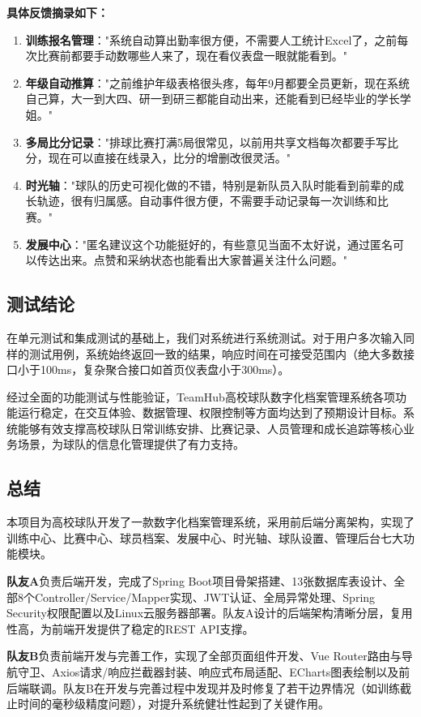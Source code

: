 \documentclass[12pt,a4paper]{ctexart}
\begin{document}
\textbf{具体反馈摘录如下：}
\begin{enumerate}[label=(\arabic*)]
\item \textbf{训练报名管理}："系统自动算出勤率很方便，不需要人工统计Excel了，之前每次比赛前都要手动数哪些人来了，现在看仪表盘一眼就能看到。"
\item \textbf{年级自动推算}："之前维护年级表格很头疼，每年9月都要全员更新，现在系统自己算，大一到大四、研一到研三都能自动出来，还能看到已经毕业的学长学姐。"
\item \textbf{多局比分记录}："排球比赛打满5局很常见，以前用共享文档每次都要手写比分，现在可以直接在线录入，比分的增删改很灵活。"
\item \textbf{时光轴}："球队的历史可视化做的不错，特别是新队员入队时能看到前辈的成长轨迹，很有归属感。自动事件很方便，不需要手动记录每一次训练和比赛。"
\item \textbf{发展中心}："匿名建议这个功能挺好的，有些意见当面不太好说，通过匿名可以传达出来。点赞和采纳状态也能看出大家普遍关注什么问题。"
\end{enumerate}

\subsection{测试结论}

在单元测试和集成测试的基础上，我们对系统进行系统测试。对于用户多次输入同样的测试用例，系统始终返回一致的结果，响应时间在可接受范围内（绝大多数接口小于100ms，复杂聚合接口如首页仪表盘小于300ms）。

经过全面的功能测试与性能验证，TeamHub高校球队数字化档案管理系统各项功能运行稳定，在交互体验、数据管理、权限控制等方面均达到了预期设计目标。系统能够有效支撑高校球队日常训练安排、比赛记录、人员管理和成长追踪等核心业务场景，为球队的信息化管理提供了有力支持。

\subsection{总结}

本项目为高校球队开发了一款数字化档案管理系统，采用前后端分离架构，实现了训练中心、比赛中心、球员档案、发展中心、时光轴、球队设置、管理后台七大功能模块。

\textbf{队友A}负责后端开发，完成了Spring Boot项目骨架搭建、13张数据库表设计、全部8个Controller/Service/Mapper实现、JWT认证、全局异常处理、Spring Security权限配置以及Linux云服务器部署。队友A设计的后端架构清晰分层，复用性高，为前端开发提供了稳定的REST API支撑。

\textbf{队友B}负责前端开发与完善工作，实现了全部页面组件开发、Vue Router路由与导航守卫、Axios请求/响应拦截器封装、响应式布局适配、ECharts图表绘制以及前后端联调。队友B在开发与完善过程中发现并及时修复了若干边界情况（如训练截止时间的毫秒级精度问题），对提升系统健壮性起到了关键作用。
\end{document}
